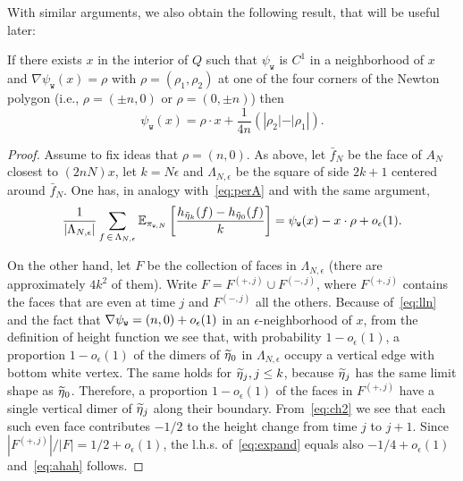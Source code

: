\documentclass[10pt]{amsart}
\theoremstyle{definition}\newtheorem{defi}[theo]{Definition}\newtheorem{rema}[theo]{Remark}\newtheorem{exam}[theo]{Example}\newtheorem{exem}[theo]{Example}\newtheorem{nota}[theo]{Notation}
\newcommand{\psiw}{\psi_{\mathtt w}}
\newcommand{\ttw}{\mathtt{w}}
\newcommand{\bbE}{\mathbb{E}}
\let\oldtilde\tilde
\renewcommand*{\tilde}[1]{\mathchoice{\widetilde{#1}}{\widetilde{#1}}{\oldtilde{#1}}{\oldtilde{#1}}}
\begin{document}
With similar arguments, we also obtain the following result, that will be useful later:
\begin{prop}\label{prop:damettere}
If there exists $x$ in the interior of $Q$ such that $\psi_{\ttw}$ is $C^1$ in a neighborhood of $x$ and $\nabla\psi_{\ttw}(x)=\rho$ with $\rho=(\rho_1,\rho_2)$ at one of the four corners of the Newton polygon (i.e., $\rho=(\pm n,0)$ or $\rho=(0,\pm n)$) then
\begin{equation}\label{eq:ahah}
\psi_{\ttw}(x)=\rho\cdot x+\frac1{4n}\left(\left|\rho_2|-|\rho_1\right|\right).
\end{equation}
\end{prop}

\begin{proof}
Assume to fix ideas that $\rho=(n,0)$. As above, let $\bar f_N$ be the face of $A_N$ closest to $(2n N) x$, let $k=N\epsilon$ and $\Lambda_{N,\epsilon}$ be the square of side $2k+1$ centered around $\bar f_N$. One has, in analogy with~\eqref{eq:perA} and with the same argument,
\begin{equation}\label{eq:expand}
\frac1{\left|\Lambda_{N,\epsilon}\right|}\sum_{f\,\in\,\Lambda_{N,\epsilon}} \bbE_{\pi_{\ttw,N}}\left[\frac{ h_{\tilde \eta_k}(f)-h_{\tilde \eta_0}(f)}k\right]= \psi_{\ttw}(x)-x\cdot \rho+o_\epsilon(1).
\end{equation}

On the other hand, let $F$ be the collection of faces in $\Lambda_{N,\epsilon}$ (there are approximately $4 k^2$ of them). Write $F=F^{(+,j)}\cup F^{(-,j)}$, where $F^{(+,j)}$ contains the faces that are even at time $j$ and $F^{(-,j)}$ all the others. Because of~\eqref{eq:lln} and the fact that $\nabla\psiw\linebreak =(n,0)+o_\epsilon(1)$ in an $\epsilon$-neighborhood of $x$, from the definition of height function we see that, with probability $1-o_\epsilon(1)$, a proportion $1-o_\epsilon(1)$ of the dimers of $\tilde \eta_0$ in $\Lambda_{N,\epsilon}$ occupy a vertical edge with bottom white vertex. The same holds for $\tilde \eta_j,j\le k$, because $\tilde \eta_j$ has the same limit shape as $\tilde \eta_0$. Therefore, a proportion $1-o_\epsilon(1)$ of the faces in $F^{(+,j)}$ have a single vertical dimer of $\tilde \eta_j$ along their boundary. From~\eqref{eq:ch2} we see that each such even face contributes $-1/2$ to the height change from time $j$ to $j+1$. Since $|F^{(+,j)}|/|F|=1/2+o_\epsilon(1)$, the l.h.s. of~\eqref{eq:expand} equals also $-1/4+o_\epsilon(1)$ and~\eqref{eq:ahah} follows.
\end{proof}
\end{document}

